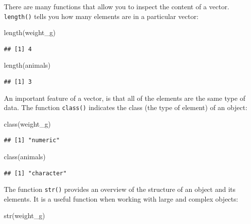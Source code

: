 \documentclass[
]{book}
\newenvironment{Shaded}{\begin{snugshade}}{\end{snugshade}}
\newcommand{\FunctionTok}[1]{\textcolor[rgb]{0.00,0.00,0.00}{#1}}
\newcommand{\NormalTok}[1]{#1}
\begin{document}
There are many functions that allow you to inspect the content of a vector. \texttt{length()} tells you how many elements are in a particular vector:

\begin{Shaded}
\begin{Highlighting}[]
\FunctionTok{length}\NormalTok{(weight\_g)}
\end{Highlighting}
\end{Shaded}

\begin{verbatim}
## [1] 4
\end{verbatim}

\begin{Shaded}
\begin{Highlighting}[]
\FunctionTok{length}\NormalTok{(animals)}
\end{Highlighting}
\end{Shaded}

\begin{verbatim}
## [1] 3
\end{verbatim}

An important feature of a vector, is that all of the elements are the same type of data. The function \texttt{class()} indicates the class (the type of element) of an object:

\begin{Shaded}
\begin{Highlighting}[]
\FunctionTok{class}\NormalTok{(weight\_g)}
\end{Highlighting}
\end{Shaded}

\begin{verbatim}
## [1] "numeric"
\end{verbatim}

\begin{Shaded}
\begin{Highlighting}[]
\FunctionTok{class}\NormalTok{(animals)}
\end{Highlighting}
\end{Shaded}

\begin{verbatim}
## [1] "character"
\end{verbatim}

The function \texttt{str()} provides an overview of the structure of an object and its elements. It is a useful function when working with large and complex objects:

\begin{Shaded}
\begin{Highlighting}[]
\FunctionTok{str}\NormalTok{(weight\_g)}
\end{Highlighting}
\end{Shaded}
\end{document}
